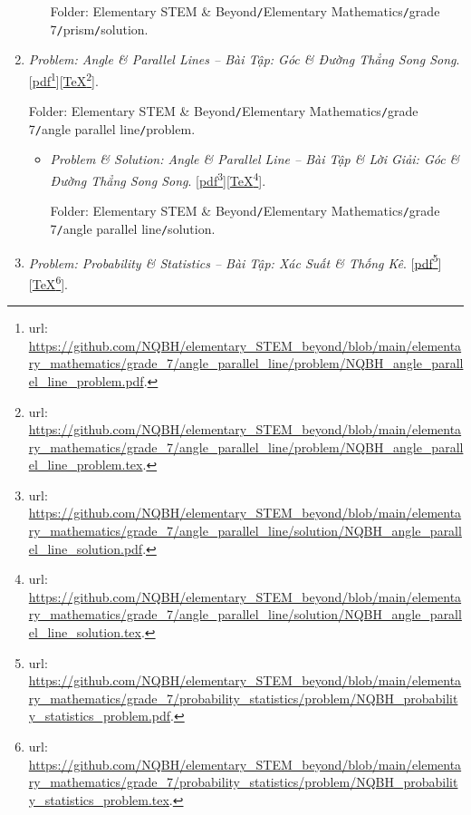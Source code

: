 \documentclass[12pt,twoside]{book}
\begin{document}
\begin{enumerate}
\begin{itemize}
		Folder: {\sf Elementary STEM \& Beyond{\tt/}Elementary Mathematics{\tt/}grade 7{\tt/}prism{\tt/}solution}.
	\end{itemize}
	\item {\it Problem: Angle \& Parallel Lines -- Bài Tập: Góc \& Đường Thẳng Song Song}. [\href{https://github.com/NQBH/elementary_STEM_beyond/blob/main/elementary_mathematics/grade_7/angle_parallel_line/problem/NQBH_angle_parallel_line_problem.pdf}{pdf}\footnote{{\sc url}: \url{https://github.com/NQBH/elementary_STEM_beyond/blob/main/elementary_mathematics/grade_7/angle_parallel_line/problem/NQBH_angle_parallel_line_problem.pdf}.}][\href{https://github.com/NQBH/elementary_STEM_beyond/blob/main/elementary_mathematics/grade_7/angle_parallel_line/problem/NQBH_angle_parallel_line_problem.tex}{\TeX}\footnote{{\sc url}: \url{https://github.com/NQBH/elementary_STEM_beyond/blob/main/elementary_mathematics/grade_7/angle_parallel_line/problem/NQBH_angle_parallel_line_problem.tex}.}].
	
	Folder: {\sf Elementary STEM \& Beyond{\tt/}Elementary Mathematics{\tt/}grade 7{\tt/}angle parallel line{\tt/}problem}.
	\begin{itemize}
		\item {\it Problem \& Solution: Angle \& Parallel Line -- Bài Tập \& Lời Giải: Góc \& Đường Thẳng Song Song}. [\href{https://github.com/NQBH/elementary_STEM_beyond/blob/main/elementary_mathematics/grade_7/angle_parallel_line/solution/NQBH_angle_parallel_line_solution.pdf}{pdf}\footnote{{\sc url}: \url{https://github.com/NQBH/elementary_STEM_beyond/blob/main/elementary_mathematics/grade_7/angle_parallel_line/solution/NQBH_angle_parallel_line_solution.pdf}.}][\href{https://github.com/NQBH/elementary_STEM_beyond/blob/main/elementary_mathematics/grade_7/angle_parallel_line/solution/NQBH_angle_parallel_line_solution.tex}{\TeX}\footnote{{\sc url}: \url{https://github.com/NQBH/elementary_STEM_beyond/blob/main/elementary_mathematics/grade_7/angle_parallel_line/solution/NQBH_angle_parallel_line_solution.tex}.}].
		
		Folder: {\sf Elementary STEM \& Beyond{\tt/}Elementary Mathematics{\tt/}grade 7{\tt/}angle parallel line{\tt/}solution}.
	\end{itemize}
	\item {\it Problem: Probability \& Statistics -- Bài Tập: Xác Suất \& Thống Kê}. [\href{https://github.com/NQBH/elementary_STEM_beyond/blob/main/elementary_mathematics/grade_7/probability_statistics/problem/NQBH_probability_statistics_problem.pdf}{pdf}\footnote{{\sc url}: \url{https://github.com/NQBH/elementary_STEM_beyond/blob/main/elementary_mathematics/grade_7/probability_statistics/problem/NQBH_probability_statistics_problem.pdf}.}][\href{https://github.com/NQBH/elementary_STEM_beyond/blob/main/elementary_mathematics/grade_7/probability_statistics/problem/NQBH_probability_statistics_problem.tex}{\TeX}\footnote{{\sc url}: \url{https://github.com/NQBH/elementary_STEM_beyond/blob/main/elementary_mathematics/grade_7/probability_statistics/problem/NQBH_probability_statistics_problem.tex}.}].
	

\end{enumerate}
\end{document}
